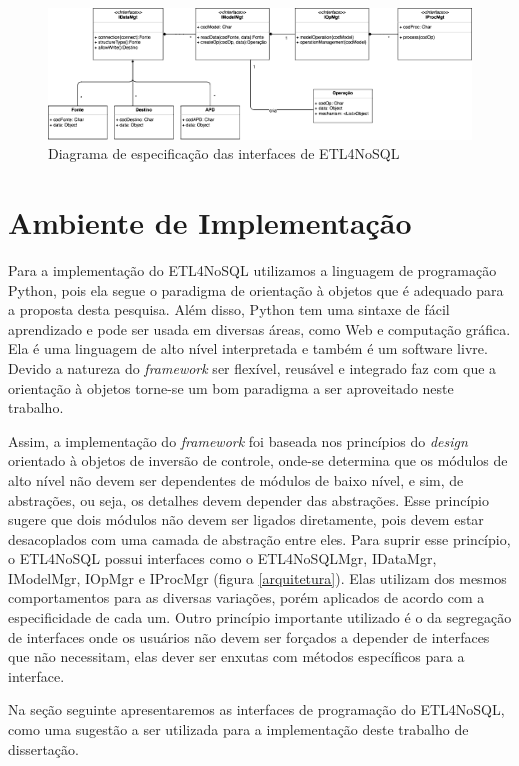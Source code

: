 \begin{figure}[h!]
	\centering
	\includegraphics[scale=0.49]{fig/interfaces.png}
	\caption{Diagrama de especificação das interfaces de ETL4NoSQL}
	\label{interfaces}
\end{figure}


\section{Ambiente de Implementação}

Para a implementação do ETL4NoSQL utilizamos a linguagem de programação Python, pois ela segue o paradigma de orientação à objetos que é adequado para a proposta desta pesquisa. Além disso, Python tem uma sintaxe de fácil aprendizado e pode ser usada em diversas áreas, como Web e computação gráfica. Ela é uma linguagem de alto nível interpretada e também é um software livre. Devido a natureza do \textit{framework} ser flexível, reusável e integrado faz com que a orientação à objetos torne-se um bom paradigma a ser aproveitado neste trabalho.

Assim, a implementação do \textit{framework} foi baseada nos princípios do \textit{design} orientado à objetos de inversão de controle, onde-se determina que os módulos de alto nível não devem ser dependentes de módulos de baixo nível, e sim, de abstrações, ou seja, os detalhes devem depender das abstrações. Esse princípio sugere que dois módulos não devem ser ligados diretamente, pois devem estar desacoplados com uma camada de abstração entre eles. Para suprir esse princípio, o ETL4NoSQL possui interfaces como o ETL4NoSQLMgr, IDataMgr, IModelMgr, IOpMgr e IProcMgr (figura \ref{arquitetura}). Elas utilizam dos mesmos comportamentos para as diversas variações, porém aplicados de acordo com a especificidade de cada um. Outro princípio importante utilizado é o da segregação de interfaces onde os usuários não devem ser forçados a depender de interfaces que não necessitam, elas dever ser enxutas com métodos específicos para a interface. 

Na seção seguinte apresentaremos as interfaces de programação do ETL4NoSQL, como uma sugestão a ser utilizada para a implementação deste trabalho de dissertação.


